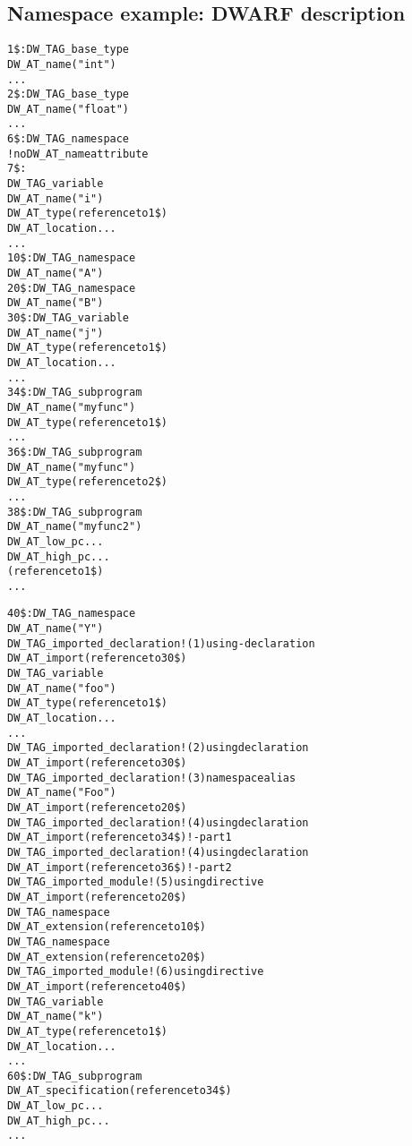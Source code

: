 \subsection{Namespace example: DWARF description}
\label{app:namespaceexampledwarfdescription}
\begin{alltt}

1\$:  DW\_TAG\_base\_type
        DW\_AT\_name("int")
        ...
2\$:  DW\_TAG\_base\_type
        DW\_AT\_name("float")
        ...
6\$:  DW\_TAG\_namespace
        ! no DW\_AT\_name attribute
7\$:
        DW\_TAG\_variable
            DW\_AT\_name("i")
            DW\_AT\_type(reference to 1\$)
            DW\_AT\_location ...
            ...
10\$: DW\_TAG\_namespace
        DW\_AT\_name("A")
20\$:    DW\_TAG\_namespace
            DW\_AT\_name("B")
30\$:        DW\_TAG\_variable
                DW\_AT\_name("j")
                DW\_AT\_type(reference to 1\$)
                DW\_AT\_location ...
                ...
34\$:        DW\_TAG\_subprogram
                DW\_AT\_name("myfunc")
                DW\_AT\_type(reference to 1\$)
                ...
36\$:        DW\_TAG\_subprogram
                DW\_AT\_name("myfunc")
                DW\_AT\_type(reference to 2\$)
                ...
38\$:        DW\_TAG\_subprogram
                DW\_AT\_name("myfunc2")
                DW\_AT\_low\_pc ...
                DW\_AT\_high\_pc ...
                (reference to 1\$)
                ...

40\$: DW\_TAG\_namespace
        DW\_AT\_name("Y")
        DW\_TAG\_imported\_declaration    ! (1) using-declaration
            DW\_AT\_import(reference to 30\$)
        DW\_TAG\_variable
            DW\_AT\_name("foo")
            DW\_AT\_type(reference to 1\$)
            DW\_AT\_location ...
            ...
     DW\_TAG\_imported\_declaration       ! (2) using declaration
        DW\_AT\_import(reference to 30\$)
        DW\_TAG\_imported\_declaration    ! (3) namespace alias
            DW\_AT\_name("Foo")
            DW\_AT\_import(reference to 20\$)
        DW\_TAG\_imported\_declaration    ! (4) using declaration
            DW\_AT\_import(reference to 34\$) ! - part 1
        DW\_TAG\_imported\_declaration    ! (4) using declaration
            DW\_AT\_import(reference to 36\$) !  - part 2
        DW\_TAG\_imported\_module         ! (5) using directive
            DW\_AT\_import(reference to 20\$)
        DW\_TAG\_namespace
            DW\_AT\_extension(reference to 10\$)
            DW\_TAG\_namespace
                DW\_AT\_extension(reference to 20\$)
                DW\_TAG\_imported\_module ! (6) using directive
                    DW\_AT\_import(reference to 40\$)
                DW\_TAG\_variable
                    DW\_AT\_name("k")
                    DW\_AT\_type(reference to 1\$)
                    DW\_AT\_location ...
                    ...
60\$: DW\_TAG\_subprogram
        DW\_AT\_specification(reference to 34\$)
        DW\_AT\_low\_pc ...
        DW\_AT\_high\_pc ...
        ...
\end{alltt}

